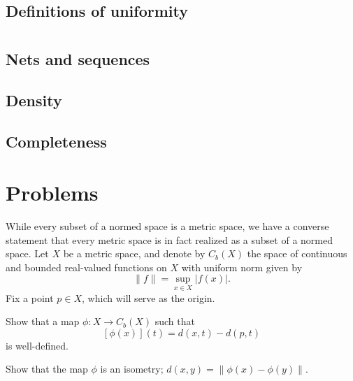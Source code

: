 \documentclass{../note}
\begin{document}
\section{Definitions of uniformity}



\chapter{}


\section{Nets and sequences}
\section{Density}
\section{Completeness}





\chapter*{Problems}

\begin{prb}
While every subset of a normed space is a metric space, we have a converse statement that every metric space is in fact realized as a subset of a normed space.
Let $X$ be a metric space, and denote by $C_b(X)$ the space of continuous and bounded real-valued functions on $X$ with uniform norm given by
\[\|f\|=\sup_{x\in X}|f(x)|.\]
Fix a point $p\in X$, which will serve as the origin.
\begin{parts}
\item Show that a map $\phi:X\to C_b(X)$ such that
\[[\phi(x)](t)=d(x,t)-d(p,t)\]
is well-defined.
\item Show that the map $\phi$ is an isometry; $d(x,y)=\|\phi(x)-\phi(y)\|$.
\end{parts}
\end{prb}
\end{document}
